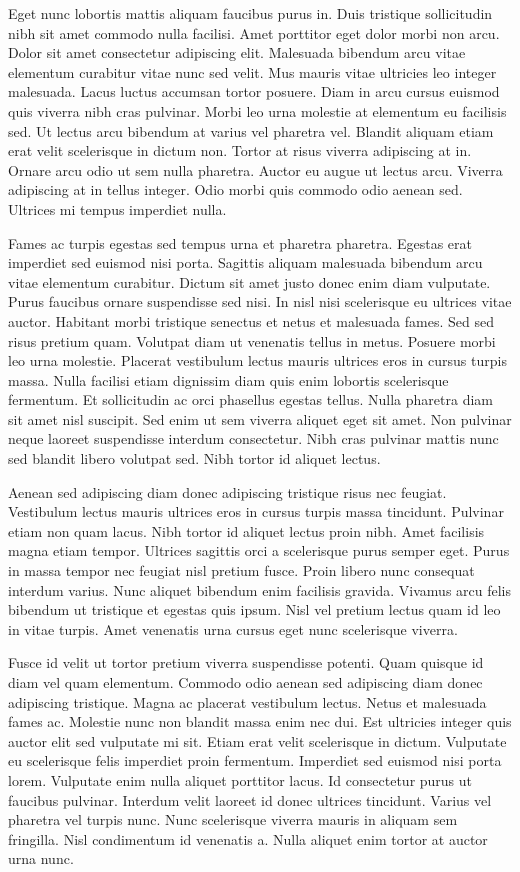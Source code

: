 \documentclass[11pt,a4paper]{article}
\begin{document}
Eget nunc lobortis mattis aliquam faucibus purus in. Duis tristique sollicitudin nibh sit amet commodo nulla facilisi. Amet porttitor eget dolor morbi non arcu. Dolor sit amet consectetur adipiscing elit. Malesuada bibendum arcu vitae elementum curabitur vitae nunc sed velit. Mus mauris vitae ultricies leo integer malesuada. Lacus luctus accumsan tortor posuere. Diam in arcu cursus euismod quis viverra nibh cras pulvinar. Morbi leo urna molestie at elementum eu facilisis sed. Ut lectus arcu bibendum at varius vel pharetra vel. Blandit aliquam etiam erat velit scelerisque in dictum non. Tortor at risus viverra adipiscing at in. Ornare arcu odio ut sem nulla pharetra. Auctor eu augue ut lectus arcu. Viverra adipiscing at in tellus integer. Odio morbi quis commodo odio aenean sed. Ultrices mi tempus imperdiet nulla.

Fames ac turpis egestas sed tempus urna et pharetra pharetra. Egestas erat imperdiet sed euismod nisi porta. Sagittis aliquam malesuada bibendum arcu vitae elementum curabitur. Dictum sit amet justo donec enim diam vulputate. Purus faucibus ornare suspendisse sed nisi. In nisl nisi scelerisque eu ultrices vitae auctor. Habitant morbi tristique senectus et netus et malesuada fames. Sed sed risus pretium quam. Volutpat diam ut venenatis tellus in metus. Posuere morbi leo urna molestie. Placerat vestibulum lectus mauris ultrices eros in cursus turpis massa. Nulla facilisi etiam dignissim diam quis enim lobortis scelerisque fermentum. Et sollicitudin ac orci phasellus egestas tellus. Nulla pharetra diam sit amet nisl suscipit. Sed enim ut sem viverra aliquet eget sit amet. Non pulvinar neque laoreet suspendisse interdum consectetur. Nibh cras pulvinar mattis nunc sed blandit libero volutpat sed. Nibh tortor id aliquet lectus.

Aenean sed adipiscing diam donec adipiscing tristique risus nec feugiat. Vestibulum lectus mauris ultrices eros in cursus turpis massa tincidunt. Pulvinar etiam non quam lacus. Nibh tortor id aliquet lectus proin nibh. Amet facilisis magna etiam tempor. Ultrices sagittis orci a scelerisque purus semper eget. Purus in massa tempor nec feugiat nisl pretium fusce. Proin libero nunc consequat interdum varius. Nunc aliquet bibendum enim facilisis gravida. Vivamus arcu felis bibendum ut tristique et egestas quis ipsum. Nisl vel pretium lectus quam id leo in vitae turpis. Amet venenatis urna cursus eget nunc scelerisque viverra.

Fusce id velit ut tortor pretium viverra suspendisse potenti. Quam quisque id diam vel quam elementum. Commodo odio aenean sed adipiscing diam donec adipiscing tristique. Magna ac placerat vestibulum lectus. Netus et malesuada fames ac. Molestie nunc non blandit massa enim nec dui. Est ultricies integer quis auctor elit sed vulputate mi sit. Etiam erat velit scelerisque in dictum. Vulputate eu scelerisque felis imperdiet proin fermentum. Imperdiet sed euismod nisi porta lorem. Vulputate enim nulla aliquet porttitor lacus. Id consectetur purus ut faucibus pulvinar. Interdum velit laoreet id donec ultrices tincidunt. Varius vel pharetra vel turpis nunc. Nunc scelerisque viverra mauris in aliquam sem fringilla. Nisl condimentum id venenatis a. Nulla aliquet enim tortor at auctor urna nunc.
\end{document}
